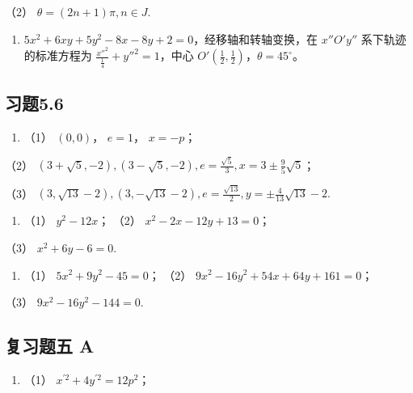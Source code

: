 （2） \(\theta = (2n + 1)\pi, n \in J.\)

\begin{enumerate}
\def\labelenumi{\arabic{enumi}.}
\setcounter{enumi}{5}
\tightlist
\item
  \(5x^{2} + 6xy + 5y^{2} - 8x - 8y + 2 = 0\)，经移轴和转轴变换，在
  \(x''O'y''\) 系下轨迹的标准方程为
  \(\frac{x''^2}{\frac{1}{4}} + y''^2 = 1\)，中心
  \(O'(\frac{1}{2}, \frac{1}{2})\)，\(\theta = 45^\circ\)。
\end{enumerate}

\subsection{习题5.6}\label{ux4e60ux98985.6}

\begin{enumerate}
\def\labelenumi{\arabic{enumi}.}
\tightlist
\item
  （1） \((0, 0)\)， \(e = 1\)， \(x = -p\)；
\end{enumerate}

（2）
\((3 + \sqrt{5}, -2), (3 - \sqrt{5}, -2), e = \frac{\sqrt{5}}{3}, x = 3 \pm \frac{9}{5} \sqrt{5}\)；

（3）
\((3, \sqrt{13} - 2), (3, -\sqrt{13} - 2), e = \frac{\sqrt{13}}{2}, y = \pm \frac{4}{13} \sqrt{13} - 2.\)

\begin{enumerate}
\def\labelenumi{\arabic{enumi}.}
\setcounter{enumi}{4}
\tightlist
\item
  （1） \(y^{2} - 12x\)； （2） \(x^{2} - 2x - 12y + 13 = 0\)；
\end{enumerate}

（3） \(x^{2} + 6y - 6 = 0.\)

\begin{enumerate}
\def\labelenumi{\arabic{enumi}.}
\setcounter{enumi}{5}
\tightlist
\item
  （1） \(5x^{2} + 9y^{2} - 45 = 0\)； （2）
  \(9x^{2} - 16y^{2} + 54x + 64y + 161 = 0\)；
\end{enumerate}

（3） \(9x^{2} - 16y^{2} - 144 = 0.\)

\subsection{复习题五 A}\label{ux590dux4e60ux9898ux4e94-a-1}

\begin{enumerate}
\def\labelenumi{\arabic{enumi}.}
\tightlist
\item
  （1） \(x^{\prime 2} + 4y^{\prime 2} = 12p^{2}\)；
\end{enumerate}

